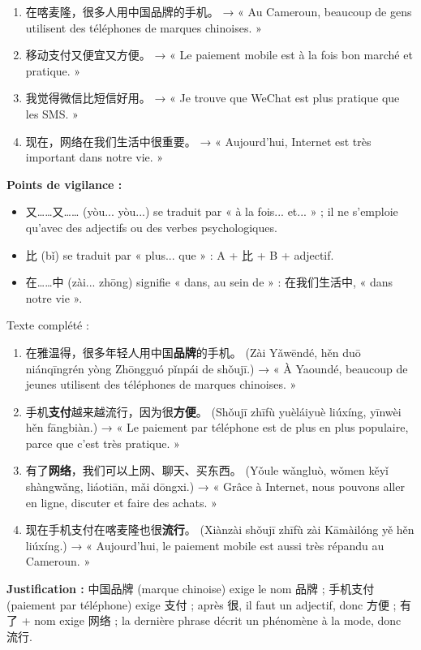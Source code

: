 \documentclass[11pt]{article}
\begin{document}
\begin{corrige}
\begin{enumerate}
\item 在喀麦隆，很多人用中国品牌的手机。 → « Au Cameroun, beaucoup de gens utilisent des téléphones de marques chinoises. »
\item 移动支付又便宜又方便。 → « Le paiement mobile est à la fois bon marché et pratique. »
\item 我觉得微信比短信好用。 → « Je trouve que WeChat est plus pratique que les SMS. »
\item 现在，网络在我们生活中很重要。 → « Aujourd'hui, Internet est très important dans notre vie. »
\end{enumerate}
\textbf{Points de vigilance :}
\begin{itemize}
\item 又……又…… (yòu... yòu...) se traduit par « à la fois... et... » ; il ne s'emploie qu'avec des adjectifs ou des verbes psychologiques.
\item 比 (bǐ) se traduit par « plus... que » : A + 比 + B + adjectif.
\item 在……中 (zài... zhōng) signifie « dans, au sein de » : 在我们生活中, « dans notre vie ».
\end{itemize}
\end{corrige}

\begin{corrige}
Texte complété :
\begin{enumerate}
\item 在雅温得，很多年轻人用中国\textbf{品牌}的手机。 (Zài Yǎwēndé, hěn duō niánqīngrén yòng Zhōngguó pǐnpái de shǒujī.) → « À Yaoundé, beaucoup de jeunes utilisent des téléphones de marques chinoises. »
\item 手机\textbf{支付}越来越流行，因为很\textbf{方便}。 (Shǒujī zhīfù yuèláiyuè liúxíng, yīnwèi hěn fāngbiàn.) → « Le paiement par téléphone est de plus en plus populaire, parce que c'est très pratique. »
\item 有了\textbf{网络}，我们可以上网、聊天、买东西。 (Yǒule wǎngluò, wǒmen kěyǐ shàngwǎng, liáotiān, mǎi dōngxi.) → « Grâce à Internet, nous pouvons aller en ligne, discuter et faire des achats. »
\item 现在手机支付在喀麦隆也很\textbf{流行}。 (Xiànzài shǒujī zhīfù zài Kāmàilóng yě hěn liúxíng.) → « Aujourd'hui, le paiement mobile est aussi très répandu au Cameroun. »
\end{enumerate}
\textbf{Justification :} 中国品牌 (marque chinoise) exige le nom 品牌 ; 手机支付 (paiement par téléphone) exige 支付 ; après 很, il faut un adjectif, donc 方便 ; 有了 + nom exige 网络 ; la dernière phrase décrit un phénomène à la mode, donc 流行.
\end{corrige}
\end{document}
